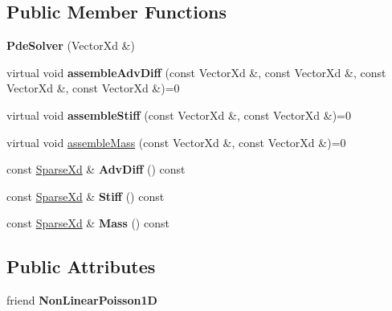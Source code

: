 \subsection*{Public Member Functions}
\begin{DoxyCompactItemize}
\item 
\hypertarget{classPdeSolver_ad86822099b3e118a49eaa0cef47bf189}{{\bfseries Pde\-Solver} (Vector\-Xd \&)}\label{classPdeSolver_ad86822099b3e118a49eaa0cef47bf189}

\item 
\hypertarget{classPdeSolver_a1cff68e39de420ce84effe9924046975}{virtual void {\bfseries assemble\-Adv\-Diff} (const Vector\-Xd \&, const Vector\-Xd \&, const Vector\-Xd \&, const Vector\-Xd \&)=0}\label{classPdeSolver_a1cff68e39de420ce84effe9924046975}

\item 
\hypertarget{classPdeSolver_a1fd0916e52471a991186617f4081edee}{virtual void {\bfseries assemble\-Stiff} (const Vector\-Xd \&, const Vector\-Xd \&)=0}\label{classPdeSolver_a1fd0916e52471a991186617f4081edee}

\item 
virtual void \hyperlink{classPdeSolver_af761d8bfc25fc0446af9d85fddfed2e2}{assemble\-Mass} (const Vector\-Xd \&, const Vector\-Xd \&)=0
\item 
\hypertarget{classPdeSolver_a30abfde92c6d3c03a976287e968ed310}{const \hyperlink{typedefs_8h_a86edf437f454f4dd79d5422366403b7f}{Sparse\-Xd} \& {\bfseries Adv\-Diff} () const }\label{classPdeSolver_a30abfde92c6d3c03a976287e968ed310}

\item 
\hypertarget{classPdeSolver_ae27e38d5d2568ffdac3d4fd6b8399386}{const \hyperlink{typedefs_8h_a86edf437f454f4dd79d5422366403b7f}{Sparse\-Xd} \& {\bfseries Stiff} () const }\label{classPdeSolver_ae27e38d5d2568ffdac3d4fd6b8399386}

\item 
\hypertarget{classPdeSolver_ad68939b3aa2acb790cd4df84ea80b931}{const \hyperlink{typedefs_8h_a86edf437f454f4dd79d5422366403b7f}{Sparse\-Xd} \& {\bfseries Mass} () const }\label{classPdeSolver_ad68939b3aa2acb790cd4df84ea80b931}

\end{DoxyCompactItemize}
\subsection*{Public Attributes}
\begin{DoxyCompactItemize}
\item 
\hypertarget{classPdeSolver_afeaaf0c1c2d83cffdfb0bfee66c55ba2}{friend {\bfseries Non\-Linear\-Poisson1\-D}}\label{classPdeSolver_afeaaf0c1c2d83cffdfb0bfee66c55ba2}

\end{DoxyCompactItemize}
